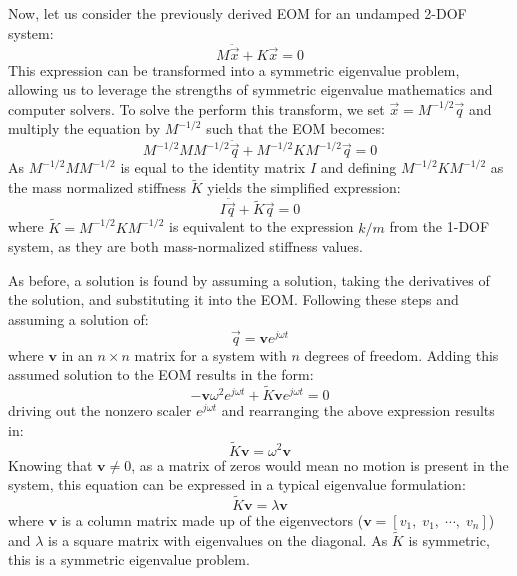 \documentclass[12pt,letter]{article}
\begin{document}
Now, let us consider the previously derived EOM for an undamped 2-DOF system:
\begin{equation}
M\ddot{\vec{x}} + K\vec{x} =0
\end{equation}
This expression can be transformed into a symmetric eigenvalue problem, allowing us to leverage the strengths of symmetric eigenvalue mathematics and computer solvers. To solve the perform this transform, we set $\vec{x}=M^{-1/2}\vec{q}$ and multiply the equation by $M^{-1/2}$ such that the EOM becomes:
\begin{equation}
M^{-1/2}MM^{-1/2}\ddot{\vec{q}} + M^{-1/2}KM^{-1/2}\vec{q} =0
\end{equation}
As $M^{-1/2}MM^{-1/2}$ is equal to the identity matrix $I$ and defining $M^{-1/2}KM^{-1/2}$ as the mass normalized stiffness $\widetilde{K}$ yields the simplified expression:
\begin{equation}
I\ddot{\vec{q}} + \widetilde{K}\vec{q} =0
\end{equation}
where $\widetilde{K}=M^{-1/2}KM^{-1/2}$ is equivalent to the expression $k/m$ from the 1-DOF system, as they are both mass-normalized stiffness values. 

\pagebreak
As before, a solution is found by assuming a solution, taking the derivatives of the solution, and substituting it into the EOM. Following these steps and assuming a solution of:
\begin{equation}
\vec{q} = \textbf{v}e^{j\omega t}
\end{equation}
where $\textbf{v}$ in an $n \times n$ matrix for a system with $n$ degrees of freedom. Adding this assumed solution to the EOM results in the form:
\begin{equation}
-\textbf{v} \omega^2 e^{j\omega t} + \widetilde{K}\textbf{v}e^{j\omega t} =0
\end{equation}
driving out the nonzero scaler $e^{j\omega t}$ and rearranging the above expression results in:
\begin{equation}
\widetilde{K}\textbf{v} =  \omega^2 \textbf{v}
\end{equation}
Knowing that $\textbf{v}\neq0$, as a matrix of zeros would mean no motion is present in the system, this equation can be expressed in a typical eigenvalue formulation:
\begin{equation}
\widetilde{K}\textbf{v} =  \lambda \textbf{v}
\label{eq:eigenvalue_problem}
\end{equation}
where $\textbf{v}$ is a column matrix made up of the eigenvectors ($\textbf{v} = [v_1, \; v_1, \; \cdots, \; v_n ]$) and 
$\lambda$ is a square matrix with eigenvalues on the diagonal. As $\widetilde{K}$ is symmetric, this is a symmetric eigenvalue problem. 
\end{document}
